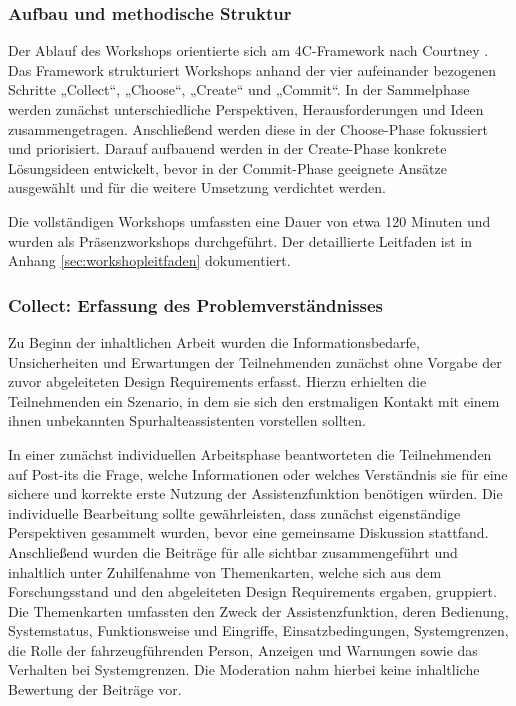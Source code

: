 \subsubsection{Aufbau und methodische Struktur}
\label{subsubsec:Aufbau_und_methodische_Struktur}

Der Ablauf des Workshops orientierte sich am 4C-Framework nach Courtney
\cite{courtney2020workshopper}. Das Framework strukturiert Workshops anhand der
vier aufeinander bezogenen Schritte „Collect“, „Choose“, „Create“ und „Commit“. In der Sammelphase werden zunächst unterschiedliche Perspektiven, Herausforderungen und Ideen zusammengetragen. Anschließend werden diese in der Choose-Phase fokussiert und priorisiert. Darauf aufbauend werden in der Create-Phase konkrete Lösungsideen entwickelt, bevor in der Commit-Phase geeignete Ansätze ausgewählt und für die weitere Umsetzung verdichtet werden.

Die vollständigen Workshops umfassten eine Dauer von etwa
120 Minuten und wurden als Präsenzworkshops durchgeführt. Der detaillierte
Leitfaden ist in Anhang \ref{sec:workshopleitfaden} dokumentiert.

\subsubsection{Collect: Erfassung des Problemverständnisses}
\label{subsubsec:Collect}

Zu Beginn der inhaltlichen Arbeit wurden die Informationsbedarfe,
Unsicherheiten und Erwartungen der Teilnehmenden zunächst ohne Vorgabe der
zuvor abgeleiteten Design Requirements erfasst. Hierzu erhielten die
Teilnehmenden ein Szenario, in dem sie sich den erstmaligen Kontakt mit einem
ihnen unbekannten Spurhalteassistenten vorstellen sollten.

In einer zunächst individuellen Arbeitsphase beantworteten die Teilnehmenden
auf Post-its die Frage, welche Informationen oder welches Verständnis sie
für eine sichere und korrekte erste Nutzung der Assistenzfunktion benötigen
würden. Die individuelle Bearbeitung sollte gewährleisten, dass zunächst
eigenständige Perspektiven gesammelt wurden, bevor eine gemeinsame Diskussion
stattfand. Anschließend wurden die Beiträge für alle sichtbar zusammengeführt und inhaltlich unter Zuhilfenahme von Themenkarten, welche sich aus dem Forschungsstand und den abgeleiteten Design Requirements ergaben, gruppiert. Die Themenkarten umfassten den Zweck der Assistenzfunktion, deren Bedienung, Systemstatus, Funktionsweise und Eingriffe, Einsatzbedingungen, Systemgrenzen, die Rolle der fahrzeugführenden Person, Anzeigen und Warnungen sowie das Verhalten bei Systemgrenzen. Die Moderation nahm hierbei keine inhaltliche Bewertung der Beiträge vor.

